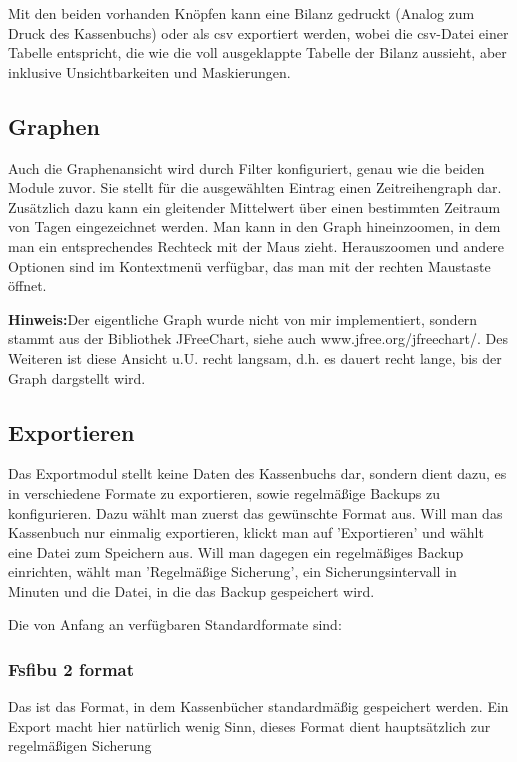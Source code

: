 \documentclass[a4paper,10pt,halfparskip,oneside,smallheadings]{scrbook}
\begin{document}
Mit den beiden vorhanden Knöpfen kann eine Bilanz gedruckt (Analog zum Druck des Kassenbuchs) oder als csv exportiert werden, wobei die csv-Datei einer Tabelle entspricht, die wie die voll ausgeklappte Tabelle der Bilanz aussieht, aber inklusive Unsichtbarkeiten und Maskierungen.

\subsection{Graphen}
Auch die Graphenansicht wird durch Filter konfiguriert, genau wie die beiden Module zuvor. Sie stellt für die ausgewählten Eintrag einen Zeitreihengraph dar. Zusätzlich dazu kann ein gleitender Mittelwert über einen bestimmten Zeitraum von Tagen eingezeichnet werden. Man kann in den Graph hineinzoomen, in dem man ein entsprechendes Rechteck mit der Maus zieht. Herauszoomen und andere Optionen sind im Kontextmenü verfügbar, das man mit der rechten Maustaste öffnet.

\textbf{Hinweis:}Der eigentliche Graph wurde nicht von mir implementiert, sondern stammt aus der Bibliothek JFreeChart, siehe auch www.jfree.org/jfreechart/. Des Weiteren ist diese Ansicht u.U. recht langsam, d.h. es dauert recht lange, bis der Graph dargstellt wird.

\subsection{Exportieren}
Das Exportmodul stellt keine Daten des Kassenbuchs dar, sondern dient dazu, es in verschiedene Formate zu exportieren, sowie regelmäßige Backups zu konfigurieren. Dazu wählt man zuerst das gewünschte Format aus. Will man das Kassenbuch nur einmalig exportieren, klickt man auf 'Exportieren' und wählt eine Datei zum Speichern aus. Will man dagegen ein regelmäßiges Backup einrichten, wählt man 'Regelmäßige Sicherung', ein Sicherungsintervall in Minuten und die Datei, in die das Backup gespeichert wird. 

Die von Anfang an verfügbaren Standardformate sind:
\subsubsection{Fsfibu 2 format}
Das ist das Format, in dem Kassenbücher standardmäßig gespeichert werden. Ein Export macht hier natürlich wenig Sinn, dieses Format dient hauptsätzlich zur regelmäßigen Sicherung
\end{document}
